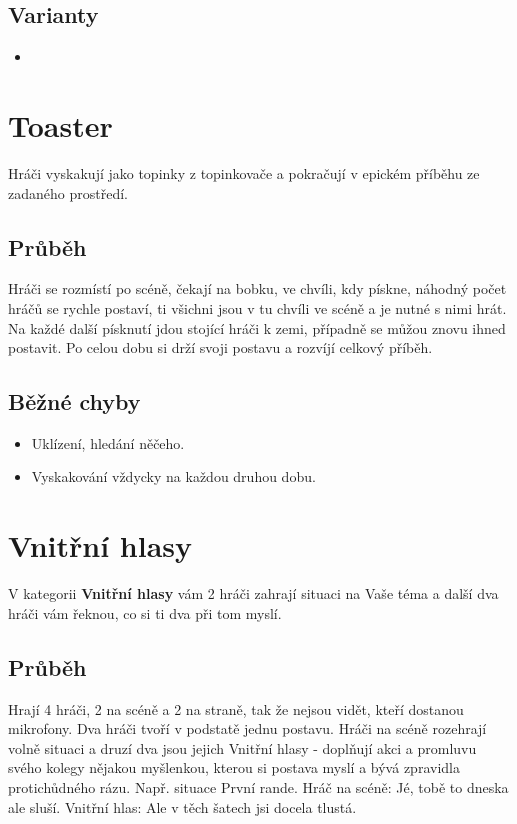 \subsection{ Varianty } \begin{itemize}
\item  {}
\end{itemize}
 
 
 
 
\needspace{5cm} \section{Toaster} \label{toaster}  
 
Hráči vyskakují jako topinky z topinkovače a pokračují v epickém příběhu ze zadaného prostředí. 
 
\subsection{ Průběh } Hráči se rozmístí po scéně, čekají na bobku, ve chvíli, kdy  pískne, náhodný počet hráčů se rychle postaví, ti všichni jsou v tu chvíli ve scéně a je nutné s nimi hrát.  Na každé další písknutí jdou stojící hráči k zemi, případně se můžou znovu ihned postavit. Po celou dobu si drží svoji postavu   a rozvíjí celkový příběh. 
 
 
\subsection{ Běžné chyby } \begin{itemize}
\item Uklízení, hledání něčeho.
\item Vyskakování vždycky na každou druhou dobu.
\end{itemize}
 
 
 
\needspace{5cm} \section{Vnitřní hlasy} \label{vnitřní hlasy}  
 
 
V kategorii \textbf{Vnitřní hlasy}{} vám 2 hráči zahrají situaci na Vaše téma a další dva hráči vám řeknou, co si ti dva při tom myslí. 
 
 
\subsection{Průběh} Hrají 4 hráči, 2 na scéně a 2 na straně, tak že nejsou vidět, kteří dostanou mikrofony.  Dva hráči tvoří v podstatě jednu postavu. Hráči na scéně rozehrají volně situaci a druzí dva jsou jejich Vnitřní hlasy - doplňují akci a promluvu svého kolegy nějakou myšlenkou, kterou si postava myslí a bývá zpravidla protichůdného rázu. Např. situace První rande. Hráč na scéně: Jé, tobě to dneska ale sluší. Vnitřní hlas: Ale v těch šatech jsi docela tlustá. 
 
